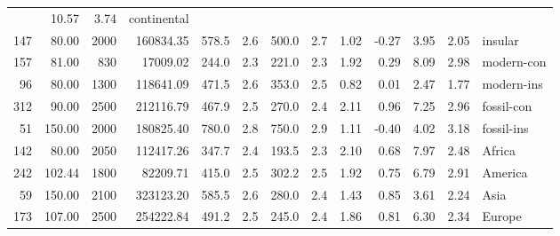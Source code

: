 \begin{landscape}
\begin{longtable}[]{@{}rrrrrrrrrrrrl@{}}
	& 10.57 & 3.74 & continental\tabularnewline
	147 & 80.00 & 2000 & 160834.35 & 578.5 & 2.6 & 500.0 & 2.7 & 1.02 &
	-0.27 & 3.95 & 2.05 & insular\tabularnewline
	157 & 81.00 & 830 & 17009.02 & 244.0 & 2.3 & 221.0 & 2.3 & 1.92 & 0.29 &
	8.09 & 2.98 & modern-con\tabularnewline
	96 & 80.00 & 1300 & 118641.09 & 471.5 & 2.6 & 353.0 & 2.5 & 0.82 & 0.01
	& 2.47 & 1.77 & modern-ins\tabularnewline
	312 & 90.00 & 2500 & 212116.79 & 467.9 & 2.5 & 270.0 & 2.4 & 2.11 & 0.96
	& 7.25 & 2.96 & fossil-con\tabularnewline
	51 & 150.00 & 2000 & 180825.40 & 780.0 & 2.8 & 750.0 & 2.9 & 1.11 &
	-0.40 & 4.02 & 3.18 & fossil-ins\tabularnewline
	142 & 80.00 & 2050 & 112417.26 & 347.7 & 2.4 & 193.5 & 2.3 & 2.10 & 0.68
	& 7.97 & 2.48 & Africa\tabularnewline
	242 & 102.44 & 1800 & 82209.71 & 415.0 & 2.5 & 302.2 & 2.5 & 1.92 & 0.75
	& 6.79 & 2.91 & America\tabularnewline
	59 & 150.00 & 2100 & 323123.20 & 585.5 & 2.6 & 280.0 & 2.4 & 1.43 & 0.85
	& 3.61 & 2.24 & Asia\tabularnewline
	173 & 107.00 & 2500 & 254222.84 & 491.2 & 2.5 & 245.0 & 2.4 & 1.86 &
	0.81 & 6.30 & 2.34 & Europe\tabularnewline
	\bottomrule
\end{longtable}
\end{landscape}